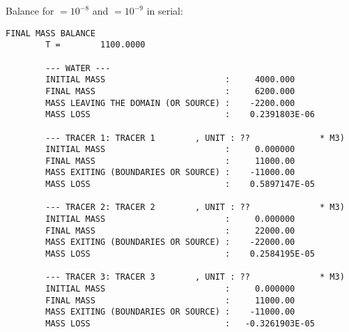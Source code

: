 Balance for  $= 10^{-8}$ and
 $= 10^{-9}$ in serial:
%
\begin{lstlisting}[language=TelFortran]
                        FINAL MASS BALANCE
        T =        1100.0000

        --- WATER ---
        INITIAL MASS                        :     4000.000
        FINAL MASS                          :     6200.000
        MASS LEAVING THE DOMAIN (OR SOURCE) :    -2200.000
        MASS LOSS                           :    0.2391803E-06

        --- TRACER 1: TRACER 1        , UNIT : ??              * M3)
        INITIAL MASS                        :     0.000000
        FINAL MASS                          :     11000.00
        MASS EXITING (BOUNDARIES OR SOURCE) :    -11000.00
        MASS LOSS                           :    0.5897147E-05

        --- TRACER 2: TRACER 2        , UNIT : ??              * M3)
        INITIAL MASS                        :     0.000000
        FINAL MASS                          :     22000.00
        MASS EXITING (BOUNDARIES OR SOURCE) :    -22000.00
        MASS LOSS                           :    0.2584195E-05

        --- TRACER 3: TRACER 3        , UNIT : ??              * M3)
        INITIAL MASS                        :     0.000000
        FINAL MASS                          :     11000.00
        MASS EXITING (BOUNDARIES OR SOURCE) :    -11000.00
        MASS LOSS                           :   -0.3261903E-05
\end{lstlisting}

